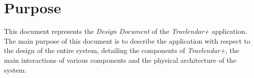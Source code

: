 \section{Purpose}
This document represents the \emph{Design Document} of the \emph{Travlendar+} application. The main purpose of this document is to describe the application with respect to the design of the entire system, detailing the components of \emph{Travlendar+}, the main interactions of various components and the physical architecture of the system.